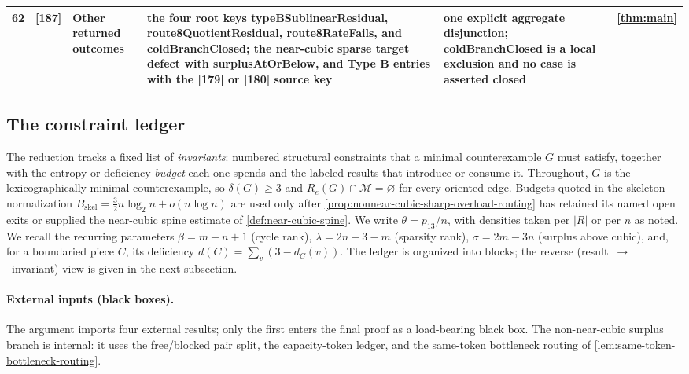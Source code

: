 \documentclass[11pt]{article}
\newcommand{\Mers}{\mathcal M}
\begin{document}
{\begin{longtable}{C{0.04\textwidth} L{0.13\textwidth} L{0.17\textwidth} L{0.25\textwidth} L{0.21\textwidth} L{0.12\textwidth}}
62 & [187] & Other returned outcomes & the four root keys typeBSublinearResidual, route8QuotientResidual, route8RateFails, and coldBranchClosed; the near-cubic sparse target defect with surplusAtOrBelow, and Type B entries with the [179] or [180] source key & one explicit aggregate disjunction; coldBranchClosed is a local exclusion and no case is asserted closed & \cref{thm:main} \\
\bottomrule
\end{longtable}
}

\subsection*{The constraint ledger}

The reduction tracks a fixed list of \emph{invariants}: numbered structural constraints that a minimal counterexample $G$ must satisfy, together with the entropy or deficiency \emph{budget} each one spends and the labeled results that introduce or consume it.  Throughout, $G$ is the lexicographically minimal counterexample, so $\delta(G)\ge3$ and $R_e(G)\cap\Mers=\varnothing$ for every oriented edge.  Budgets quoted in the skeleton normalization $B_{\mathrm{skel}}=\tfrac32 n\log_2 n+o(n\log n)$ are used only after \cref{prop:nonnear-cubic-sharp-overload-routing} has retained its named open exits or supplied the near-cubic spine estimate of \cref{def:near-cubic-spine}.  We write $\theta=p_{13}/n$, with densities taken per $|R|$ or per $n$ as noted.  We recall the recurring parameters $\beta=m-n+1$ (cycle rank), $\lambda=2n-3-m$ (sparsity rank), $\sigma=2m-3n$ (surplus above cubic), and, for a boundaried piece $C$, its deficiency $d(C)=\sum_{v}(3-d_C(v))$.  The ledger is organized into blocks; the reverse (result~$\to$~invariant) view is given in the next subsection.

\paragraph{External inputs (black boxes).}
The argument imports four external results; only the first enters the final
proof as a load-bearing black box.  The non-near-cubic surplus branch is
internal: it uses the
free/blocked pair split, the capacity-token ledger, and the same-token
bottleneck routing of \cref{lem:same-token-bottleneck-routing}.
\end{document}
